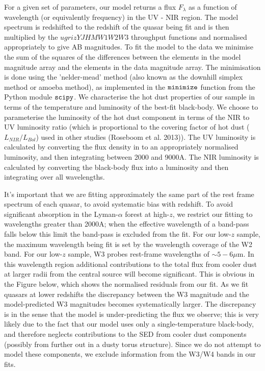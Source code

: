 For a given set of parameters, our model returns a flux $F_{\lambda}$ as a function of wavelength (or equivalently frequency) in the UV - NIR region. 
The model spectrum is redshifted to the redshift of the quasar being fit and is then multiplied by the $ugrizYJHMW1W2W3$ throughput functions and normalised appropriately to give AB magnitudes. 
To fit the model to the data we minimise the sum of the squares of the differences between the elements in the model magnitude array and the elements in the data magnitude array. 
The minimisation is done using the 'nelder-mead' method (also known as the downhill simplex method or amoeba method), as implemented in the ${\tt minimize}$ function from the Python module ${\tt scipy}$. 
We characterise the hot dust properties of our sample in terms of the temperature and luminosity of the best-fit black-body. 
We choose to parameterise the luminosity of the hot dust component in terms of the NIR to UV luminosity ratio (which is proportional to the covering factor of hot dust ($L_{NIR}/L_{Bol}$) used in other studies (Roseboom et al. 2013)). 
The UV luminosity is calculated by converting the flux density in to an appropriately normalised luminosity, and then integrating between 2000 and 9000A. 
The NIR luminosity is calculated by converting the black-body flux into a luminosity and then integrating over all wavelengths. 

It's important that we are fitting approximately the same part of the rest frame spectrum of each quasar, to avoid systematic bias with redshift. 
To avoid significant absorption in the Lyman-$\alpha$ forest at high-$z$, we restrict our fitting to wavelengths greater than 2000A; when the effective wavelength of a band-pass falls below this limit the band-pass is excluded from the fit. 
For our low-$z$ sample, the maximum wavelength being fit is set by the wavelength coverage of the W2 band. 
For our low-$z$ sample, W3 probes rest-frame wavelengths of $\sim 5-6 \mu$m. 
In this wavelength region additional contributions to the total flux from cooler dust at larger radii from the central source will become significant. 
This is obvious in the Figure below, which shows the normalised residuals from our fit. 
As we fit quasars at lower redshifts the discrepancy between the W3 magnitude and the model-predicted W3 magnitudes becomes systematically larger. 
The discrepancy is in the sense that the model is under-predicting the flux we observe; this is very likely due to the fact that our model uses only a single-temperature black-body, and therefore neglects contributions to the SED from cooler dust components (possibly from further out in a dusty torus structure). 
Since we do not attempt to model these components, we exclude information from the W3/W4 bands in our fits. 


